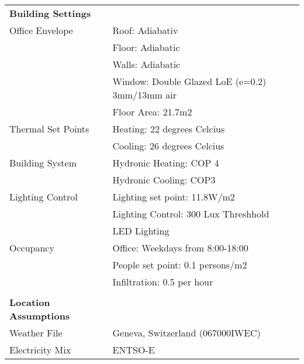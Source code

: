 \begin{table}[H]
\centering
\begin{tabular}{ll}

\textbf{Building Settings}    &                                                \\
Office Envelope               & Roof: Adiabativ                                \\
                              & Floor: Adiabatic                               \\
                              & Walls: Adiabatic                               \\
                              & Window: Double Glazed LoE (e=0.2) 3mm/13mm air \\
                              & Floor Area: 21.7m2                             \\
Thermal Set Points            & Heating: 22 degrees Celcius                    \\
                              & Cooling: 26 degrees Celcius                    \\
Building System               & Hydronic Heating: COP 4                        \\
                              & Hydronic Cooling: COP3                         \\
Lighting Control              & Lighting set point: 11.8W/m2                   \\
                              & Lighting Control: 300 Lux Threshhold           \\
                              & LED Lighting                                   \\
Occupancy                     & Office: Weekdays from 8:00-18:00               \\
                              & People set point: 0.1 persons/m2               \\
                              & Infiltration: 0.5 per hour                     \\
                              &                                                \\
\textbf{Location Assumptions} &                                                \\
Weather File                  & Geneva, Switzerland (067000IWEC)              \\
Electricity Mix               & ENTSO-E\cite{itten2012life}                                           \\

\end{tabular}
\end{table}

